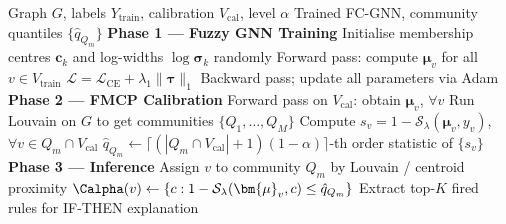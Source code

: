 \begin{algorithm}[t]
\caption{FC-GNN Training and Calibration}
\label{alg:training}
\begin{algorithmic}[1]
\Require Graph $G$, labels $Y_\text{train}$, calibration $V_\text{cal}$,
         level $\alpha$
\Ensure Trained FC-GNN, community quantiles $\{\hat{q}_{Q_m}\}$
\State \textbf{Phase 1 — Fuzzy GNN Training}
\State Initialise membership centres $\bm{c}_k$ and log-widths
       $\log\bm{\sigma}_k$ randomly
  \State Forward pass: compute $\bm{\mu}_v$ for all $v \in V_\text{train}$
  \State $\mathcal{L} = \mathcal{L}_\text{CE} +
         \lambda_1 \|\bm{\tau}\|_1$
  \State Backward pass; update all parameters via Adam
\EndFor
\State \textbf{Phase 2 — FMCP Calibration}
\State Forward pass on $V_\text{cal}$: obtain $\bm{\mu}_v$, $\forall v$
\State Run Louvain on $G$ to get communities $\{Q_1, \ldots, Q_M\}$
  \State Compute $s_v = 1 - \mathcal{S}_\lambda(\bm{\mu}_v, y_v)$,
         $\forall v \in Q_m \cap V_\text{cal}$
  \State $\hat{q}_{Q_m} \leftarrow \lceil(|Q_m \cap V_\text{cal}|+1)(1-\alpha)\rceil$-th
         order statistic of $\{s_v\}$
\EndFor
\State \textbf{Phase 3 — Inference}
  \State Assign $v$ to community $Q_m$ by Louvain / centroid proximity
  \State $\Calpha(v) \leftarrow \{c : 1 - \mathcal{S}_\lambda(\bm{\mu}_v, c)
         \le \hat{q}_{Q_m}\}$
  \State Extract top-$K$ fired rules for IF-THEN explanation
\EndFor
\end{algorithmic}
\end{algorithm}
